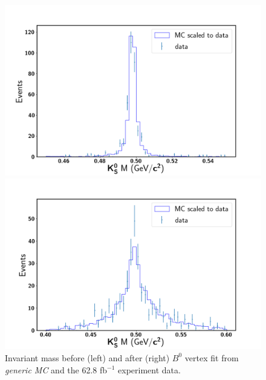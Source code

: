 \begin{figure}[htbp]
\begin{minipage}[b]{0.5\linewidth}
	\centering 
	\includegraphics[width=1\linewidth]{figures/best_KsM}	
\end{minipage}
\begin{minipage}[b]{0.5\linewidth}
	\centering 
	\includegraphics[width=1\linewidth]{figures/best_KsInvM}	
\end{minipage}
\caption{Invariant mass before (left) and after (right) $B^0$ vertex fit from \textit{generic MC} and the 62.8 fb$^{-1}$ experiment data.}
\label{fig:b0ksmass}
\end{figure}

